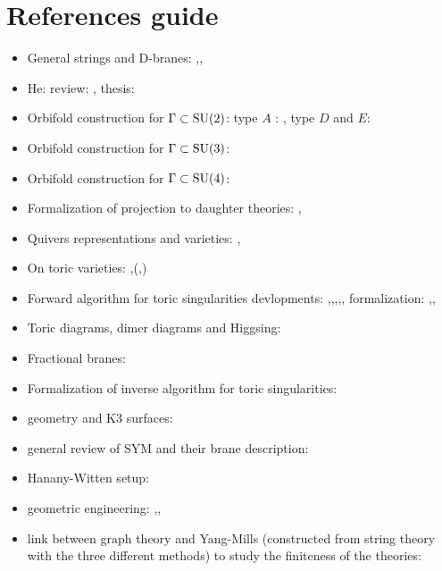 \section{References guide}

    \begin{itemize}
        \item General strings and D-branes: \cite{DbranespartI},\cite{DbranespartII},\cite{notesDbranes}
        \item He: review: \cite{he2004lectures}, thesis: \cite{masterHe}
        \item Orbifold construction for $\Gamma\subset\text{SU}(2)$: type $A$ : \cite{douglas1996dbranes}, type $D$ and $E$: \cite{PhysRevD.55.6382}
        \item Orbifold construction for $\Gamma\subset\text{SU}(3)$:\cite{Hanany_1999}
        \item Orbifold construction for $\Gamma\subset\text{SU}(4)$:\cite{Hanany:1999sp}
        \item Formalization of projection to daughter theories: \cite{vafa1998},\cite{silervstein1998}
        \item Quivers representations and varieties: \cite{brion},\cite{kirillov2016quiver}
        \item On toric varieties: \cite{cox2011toric},\cite{torigeomandCY}(\cite{fulton1993introduction},\cite{oda1988convex})
        \item Forward algorithm  for toric singularities devlopments: \cite{FA1},\cite{FA2},\cite{FA3},\cite{FA4},\cite{FA5}, formalization: \cite{FA6},\cite{FA7},\cite{FA8}
        \item Toric diagrams, dimer diagrams and Higgsing: \cite{Argurio_20081}
        \item Fractional branes: \cite{Argurio_20082}
        \item Formalization of inverse algorithm for toric singularities: \cite{Feng_2001}
        \item geometry and K3 surfaces: \cite{https://doi.org/10.48550/arxiv.hep-th/9611137}
        \item general review of SYM and their brane description: \cite{Elitzur_1997}
        \item Hanany-Witten setup: \cite{1997}
        \item geometric engineering: \cite{https://doi.org/10.48550/arxiv.hep-th/9706110},\cite{Katz:1996xe},\cite{Katz:1996fh}
        \item link between graph theory and Yang-Mills (constructed from string theory with the three different methods) to study the finiteness of the theories: \cite{Hanany:1999sp}
    \end{itemize}